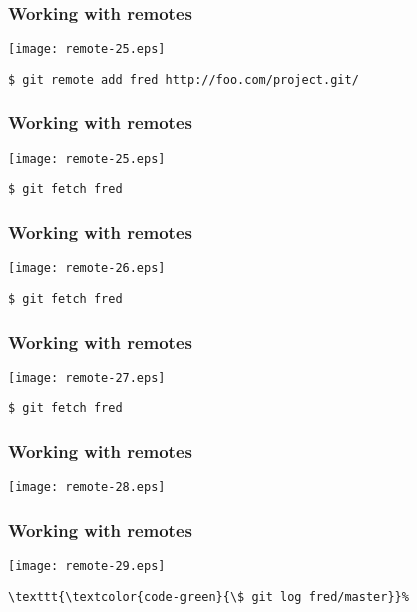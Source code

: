 \documentclass[english]{beamer}
\newcommand{\CMD}[1]{%
\texttt{\textcolor{code-green}{#1}}%
}
\newcommand{\red}[1]{%
\textcolor{code-red}{#1}%
}
\begin{document}
\begin{frame}[fragile]
\frametitle{Working with remotes}

\texttt{[image: remote-25.eps]}

\CMD{\$ git remote add \red{fred} http://foo.com/project.git/}
\vspace{\textheight}
\end{frame}

\begin{frame}[fragile]
\frametitle{Working with remotes}

\texttt{[image: remote-25.eps]}

\CMD{\$ git fetch \red{fred}}
\vspace{\textheight}
\end{frame}

\begin{frame}[fragile]
\frametitle{Working with remotes}

\texttt{[image: remote-26.eps]}

\CMD{\$ git fetch \red{fred}}
\vspace{\textheight}
\end{frame}

\begin{frame}[fragile]
\frametitle{Working with remotes}

\texttt{[image: remote-27.eps]}

\CMD{\$ git fetch \red{fred}}
\vspace{\textheight}
\end{frame}

\begin{frame}[fragile]
\frametitle{Working with remotes}

\texttt{[image: remote-28.eps]}

\vspace{\textheight}
\end{frame}

\begin{frame}[fragile]
\frametitle{Working with remotes}

\texttt{[image: remote-29.eps]}

\begin{Verbatim}[commandchars=\\\{\}]
\CMD{\$ git log fred/master}
\end{Verbatim}

\vspace{\textheight}
\end{frame}
\end{document}
